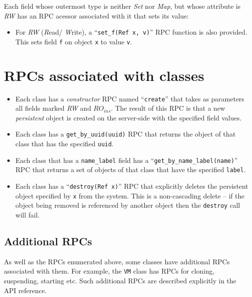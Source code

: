 Each field whose outermost type is neither {\em Set\/} nor {\em Map\/}, 
but whose attribute is {\em RW} has an RPC acessor associated with it
that sets its value:
\begin{itemize}
\item For {\em RW\/} ({\em R\/}ead/{\em
W\/}rite), a ``{\tt set\_f(Ref x, v)}'' RPC function is also provided.
This sets field {\tt f} on object {\tt x} to value {\tt v}.
\end{itemize}

\section{RPCs associated with classes}

\begin{itemize}
\item Each class has a {\em constructor\/} RPC named ``{\tt create}'' that
takes as parameters all fields marked {\em RW\/} and
$\mathit{RO}_\mathit{ins}$. The result of this RPC is that a new {\em
persistent\/} object is created on the server-side with the specified field
values.

\item Each class has a {\tt get\_by\_uuid(uuid)} RPC that returns the object
of that class that has the specified {\tt uuid}.

\item Each class that has a {\tt name\_label} field has a
``{\tt get\_by\_name\_label(name)}'' RPC that returns a set of objects of that
class that have the specified {\tt label}.

\item Each class has a ``{\tt destroy(Ref x)}'' RPC that explicitly deletes
the persistent object specified by {\tt x} from the system.  This is a
non-cascading delete -- if the object being removed is referenced by another
object then the {\tt destroy} call will fail.

\end{itemize}

\subsection{Additional RPCs}

As well as the RPCs enumerated above, some classes have additional RPCs
associated with them. For example, the {\tt VM} class has RPCs for cloning,
suspending, starting etc. Such additional RPCs are described explicitly
in the API reference.

